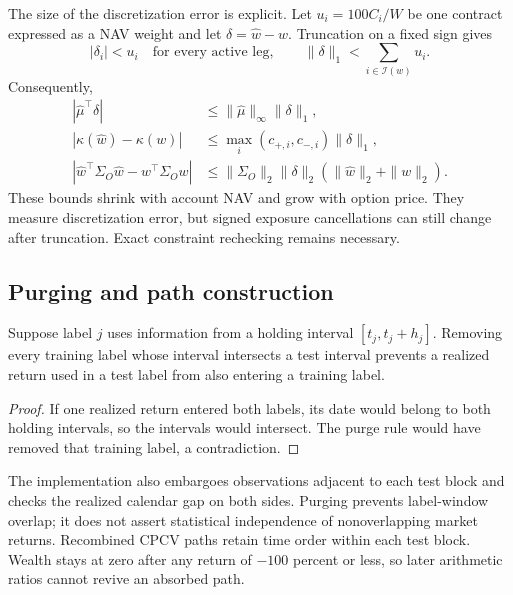The size of the discretization error is explicit. Let
\(u_i=100C_i/W\) be one contract expressed as a NAV weight and let
\(\delta=\widehat w-w\). Truncation on a fixed sign gives
\begin{equation}
  |\delta_i|<u_i\quad\text{for every active leg},
  \qquad
  \|\delta\|_1<\sum_{i\in\mathcal I(w)}u_i.
  \label{eq:app_integer_error}
\end{equation}
Consequently,
\begin{align}
  |\widehat\mu^\top\delta|
  &\le\|\widehat\mu\|_\infty\|\delta\|_1, \\
  |\kappa(\widehat w)-\kappa(w)|
  &\le\max_i(c_{+,i},c_{-,i})\|\delta\|_1, \\
  |\widehat w^\top\Sigma_O\widehat w-w^\top\Sigma_Ow|
  &\le\|\Sigma_O\|_2\|\delta\|_2
       (\|\widehat w\|_2+\|w\|_2).
  \label{eq:app_integer_risk_error}
\end{align}
These bounds shrink with account NAV and grow with option price. They measure
discretization error, but signed exposure cancellations can still change after
truncation. Exact constraint rechecking remains necessary.

\subsection{Purging and path construction}

\begin{lemma}
Suppose label \(j\) uses information from a holding interval \([t_j,t_j+h_j]\). Removing
every training label whose interval intersects a test interval prevents a realized return
used in a test label from also entering a training label.
\end{lemma}
\begin{proof}
If one realized return entered both labels, its date would belong to both holding
intervals, so the intervals would intersect. The purge rule would have removed that
training label, a contradiction.
\end{proof}

The implementation also embargoes observations adjacent to each test block and checks the
realized calendar gap on both sides. Purging prevents label-window overlap; it does not
assert statistical independence of nonoverlapping market returns. Recombined CPCV paths
retain time order within each test block. Wealth stays at zero after any return of
\(-100\) percent or less, so later arithmetic ratios cannot revive an absorbed path.

